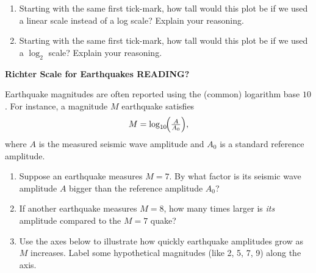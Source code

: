 \documentclass[noauthor,nooutcomes,handout,hints,12pt]{ximera}
\begin{document}
\begin{question}
\begin{center}
    \end{center}
    \begin{enumerate}
        \item Starting with the same first tick-mark, how tall would this plot be if we used a linear scale instead of a log scale? Explain your reasoning.
        \item Starting with the same first tick-mark, how tall would this plot be if we used a $\log_2$ scale? Explain your reasoning.
    \end{enumerate}
\end{question}

\mynewpage

\begin{question}
    \textbf{Richter Scale for Earthquakes READING?}

    Earthquake magnitudes are often reported using the (common) logarithm
    base \(10\). For instance, a magnitude \(M\) earthquake satisfies
    \[
        M = \log_{10}\!\Bigl(\tfrac{A}{A_0}\Bigr),
    \]
    where \(A\) is the measured seismic wave amplitude and \(A_0\) is a
    standard reference amplitude.

    \begin{enumerate}
        \item Suppose an earthquake measures \(M=7\). By what factor is its
              seismic wave amplitude \(A\) bigger than the reference amplitude
              \(A_0\)?

        \item If another earthquake measures \(M=8\), how many times larger is
              \emph{its} amplitude compared to the \(M=7\) quake?

        \item Use the axes below to illustrate how quickly earthquake
              amplitudes grow as \(M\) increases. Label some hypothetical
              magnitudes (like 2, 5, 7, 9) along the axis.

    \end{enumerate}

    \begin{center}
    \end{center}
\end{question}
\end{document}
